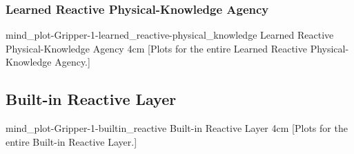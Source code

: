 {\newpage
  \noindent\begin{minipage}{\textwidth}
    \subsubsection{Learned Reactive Physical-Knowledge Agency}
    \experimentcausegroupplots{\dataappendixmaxtime}
                           {\dataappendixexperimentonemaxtime}
                           {\dataappendixexperimenttwomaxtime}
                           {\dataappendixexperimentthreemaxtime}
                           {\dataappendixexperimentonename}
                           {\dataappendixexperimenttwoname}
                           {\dataappendixexperimentthreename}
                           {\dataappendixexperimentoneprettyname}
                           {\dataappendixexperimenttwoprettyname}
                           \experimentcausegroupplotscontinued{\dataappendixexperimentthreeprettyname}
                                                              {mind_plot-Gripper-1-learned_reactive-physical_knowledge}
                                                              {Learned Reactive Physical-Knowledge Agency}
                                                              {\experimentdatacommontablereference}
                                                              {4cm}
    \experimentdatablocksworldexample
    [Plots for the entire
      Learned Reactive Physical-Knowledge Agency.]{}
  \label{figure:mind_plot-Gripper-1-learned_reactive-physical_knowledge}
  \end{minipage}
}
{\newpage
  \noindent\begin{minipage}{\textwidth}
    \subsection{Built-in Reactive Layer}
    \experimentcausegroupplots{\dataappendixmaxtime}
                           {\dataappendixexperimentonemaxtime}
                           {\dataappendixexperimenttwomaxtime}
                           {\dataappendixexperimentthreemaxtime}
                           {\dataappendixexperimentonename}
                           {\dataappendixexperimenttwoname}
                           {\dataappendixexperimentthreename}
                           {\dataappendixexperimentoneprettyname}
                           {\dataappendixexperimenttwoprettyname}
                           \experimentcausegroupplotscontinued{\dataappendixexperimentthreeprettyname}
                                                              {mind_plot-Gripper-1-builtin_reactive}
                                                              {Built-in Reactive Layer}
                                                              {\experimentdatacommontablereference}
                                                              {4cm}
    \experimentdatablocksworldexample
    [Plots for the entire
      Built-in Reactive Layer.]{}
  \label{figure:mind_plot-Gripper-1-builtin_reactive}
  \end{minipage}
}

